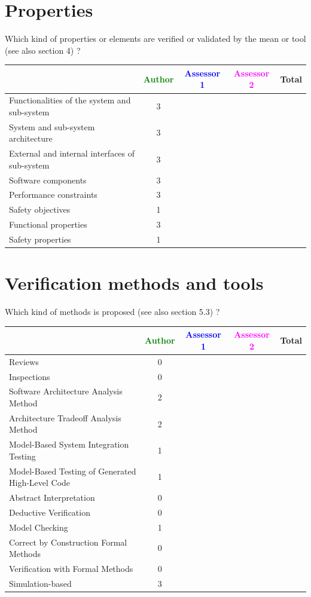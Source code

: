 \section{Properties}

Which kind of properties or elements are verified or validated by the mean or tool (see also \citep{D4.1} section 4)  ?



\begin{tabular}{|l | c | c | c | c|}
\hline
& \textcolor{green}{Author} & \textcolor{blue}{Assessor 1} & \textcolor{magenta}{Assessor 2} & Total \\
\hline 
Functionalities of the system and sub-system &3 & & &  \\
\hline
System and sub-system architecture &3 & & &  \\
\hline
External and internal interfaces of sub-system &3 & & &  \\
\hline
Software components &3 & & &  \\
\hline
Performance constraints &3 & & &  \\
\hline
Safety objectives &1 & & &  \\
\hline
Functional properties &3 & & &  \\
\hline
Safety properties &1 & & &  \\
\hline
\end{tabular}

\section{Verification methods and tools}

Which kind of methods is proposed (see also \citep{D4.1} section 5.3) ?

\begin{tabular}{|l | c | c | c | c|}
\hline
& \textcolor{green}{Author} & \textcolor{blue}{Assessor 1} & \textcolor{magenta}{Assessor 2} & Total \\
\hline 
Reviews &0 & & &  \\
\hline
Inspections &0 & & &  \\
\hline
Software Architecture Analysis Method &2 & & &  \\
\hline
Architecture Tradeoff Analysis Method &2 & & &  \\
\hline
Model-Based System Integration Testing &1 & & &  \\
\hline
Model-Based Testing of Generated High-Level Code &1 & & &  \\
\hline
Abstract Interpretation &0 & & &  \\
\hline
Deductive Verification &0 & & &  \\
\hline
Model Checking &1 & & &  \\
\hline
Correct by Construction Formal Methods &0 & & &  \\
\hline
Verification with Formal Methods &0 & & &  \\
\hline
Simulation-based &3 & & &  \\
\hline
\end{tabular}

